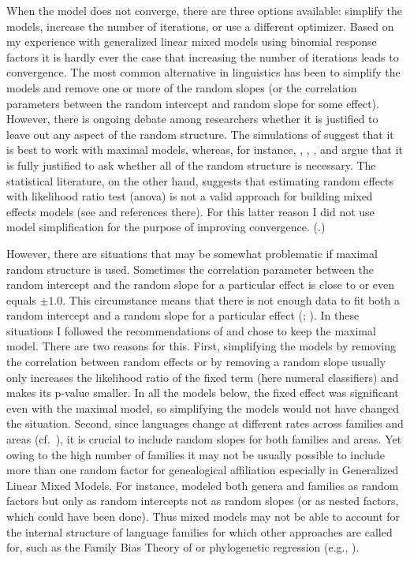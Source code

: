 \documentclass[output=collectionpaper]{langsci/langscibook}
\begin{document}
When the model does not converge, there are three options available: simplify the models, increase the number of iterations, or use a different optimizer. Based on my experience with generalized linear mixed models using binomial response factors it is hardly ever the case that increasing the number of iterations leads to convergence. The most common alternative in linguistics has been to simplify the models and remove one or more of the random slopes (or the correlation parameters between the random intercept and random slope for some effect). However, there is ongoing debate among researchers whether it is justified to leave out any aspect of the random structure. The simulations of \citet{Barr2013} suggest that it is best to work with maximal models, whereas, for instance, \citet{Baayen2008a}, \citet[395]{Baayen2008}, \citet{Bates2015a}, and \citet{Gries2015} argue that it is fully justified to ask whether all of the random structure is necessary. The statistical literature, on the other hand, suggests that estimating random effects with likelihood ratio test (anova) is not a valid approach for building mixed effects models (see \citealt[8]{Kimballsubmitted} and references there). For this latter reason I did not use model simplification for the purpose of improving convergence. (\citealt{Kimballsubmitted}.)

However, there are situations that may be somewhat problematic if maximal random structure is used. Sometimes the correlation parameter between the random intercept and the random slope for a particular effect is close to or even equals $\pm1.0$. This circumstance means that there is not enough data to fit both a random intercept and a random slope for a particular effect (\citealt{Baayen2008}; \citealt{Bates2015a}). In these situations I followed the recommendations of \citet{Barr2013} and chose to keep the maximal model. There are two reasons for this. First, simplifying the models by removing the correlation between random effects or by removing a random slope usually only increases the likelihood ratio of the fixed term (here numeral classifiers) and makes its p-value smaller. In all the models below, the fixed effect was significant even with the maximal model, so simplifying the models would not have changed the situation. Second, since languages change at different rates across families and areas (cf.\ \citealt{Nichols2003}), it is crucial to include random slopes for both families and areas. Yet owing to the high number of families it may not be usually possible to include more than one random factor for genealogical affiliation especially in Generalized Linear Mixed Models. For instance, \citet{Atkinson2011} modeled both genera and families as random factors but only as random intercepts not as random slopes (or as nested factors, which could have been done). Thus mixed models may not be able to account for the internal structure of language families for which other approaches are called for, such as the Family Bias Theory of \citet{Bickel2013b} or phylogenetic regression (e.g., \citealt{Dunn2011}).
\end{document}
